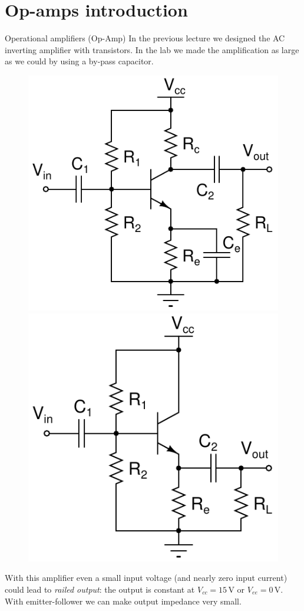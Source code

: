 \documentclass[beamer]{standalone}
\begin{document}
\section{Op-amps introduction}
\begin{frame}{Operational amplifiers (Op-Amp)}
 In the previous lecture we designed the AC inverting amplifier with transistors.  In the lab we made the amplification as large as we could by using a by-pass capacitor.
 \begin{figure}
  \includegraphics[height=0.45\textheight]{./schematics/npn_ac_common_emitter_amplifier_with_ac_boost}
  \includegraphics[height=0.45\textheight]{./schematics/npn_ac_emitter_follower}
\end{figure}
 With this amplifier even a small input voltage (and nearly zero input current) could lead to \emph{railed output}: the output is constant at $V_{cc} = 15$\,V or $V_{ee} = 0$\,V.  With emitter-follower we can make output impedance very small.
\end{frame}
\end{document}
